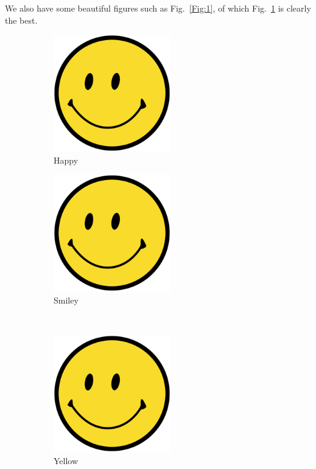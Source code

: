 \documentclass{lab}
\begin{document}
We also have some beautiful figures such as Fig.~\ref{Fig:1}, of which
Fig.~\ref{Fig:b_bright} is clearly the best.

\blindtext[2]

\begin{figure}[ht]
  \centering
  \begin{subfigure}{0.45\textwidth}
    \includegraphics[width=\textwidth,height=2in]{smile}
    \caption{Happy}\label{Fig:b_bright}
  \end{subfigure}
  \hfill
  \begin{subfigure}{0.45\textwidth}
    \includegraphics[width=\textwidth,height=2in]{smile}
    \caption{Smiley}\label{Fig:b_dark}
  \end{subfigure}
  \\
  \begin{subfigure}{0.45\textwidth}
    \includegraphics[width=\textwidth,height=2in]{smile}
    \caption{Yellow}\label{Fig:d_bright}
  \end{subfigure}
  \hfill
  \begin{subfigure}{0.45\textwidth}

\end{subfigure}
\end{figure}
\end{document}

